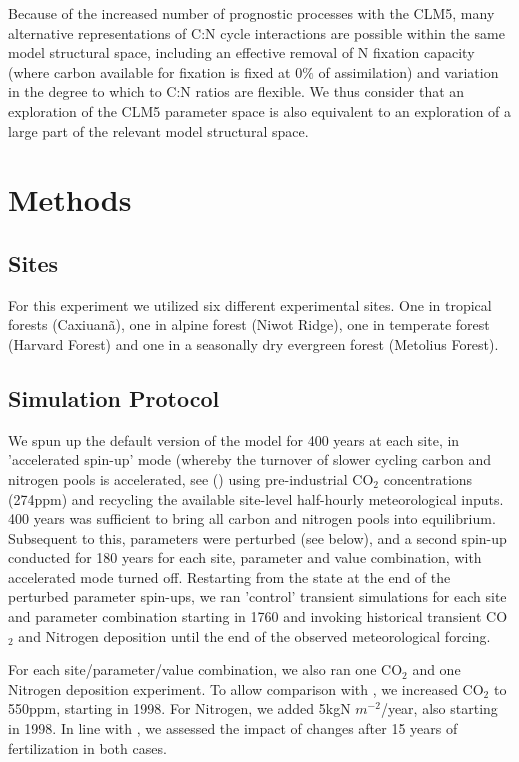 \documentclass[draft,linenumbers]{agujournal}
\begin{document}
Because of the increased number of prognostic processes with the CLM5, many alternative representations of C:N cycle interactions are possible within the same model structural space, including an effective removal of N fixation capacity (where carbon available for fixation is fixed at 0$\%$ of assimilation) and variation in the degree to which to C:N ratios are flexible. We thus consider that an exploration of the CLM5 parameter space is also equivalent to an exploration of a large part of the relevant model structural space.

\section{Methods}

\subsection{Sites}

For this experiment we utilized six different experimental sites. One in tropical forests (Caxiuan\~a), one in alpine forest (Niwot Ridge), one in temperate forest (Harvard Forest) and one in a seasonally dry evergreen forest (Metolius Forest).

\subsection{Simulation Protocol}
We spun up the default version of the model for 400 years at each site, in 'accelerated spin-up' mode (whereby the turnover of slower cycling carbon and nitrogen pools is accelerated, see (\cite{lawrence2018}) using pre-industrial CO$_{2}$ concentrations (274ppm) and recycling the available site-level half-hourly meteorological inputs. 400 years was sufficient to bring all carbon and nitrogen pools into equilibrium. Subsequent to this, parameters were perturbed (see below), and a second spin-up conducted for 180 years for each site, parameter and value combination, with accelerated mode turned off. Restarting from the state at the end of the perturbed parameter spin-ups, we ran 'control' transient simulations for each site and parameter combination starting in 1760 and invoking historical transient CO$_{2}$ and Nitrogen deposition until the end of the observed meteorological forcing.

For each site/parameter/value combination, we also ran one CO$_{2}$ and one Nitrogen deposition experiment. To allow comparison with \cite{wieder}, we increased CO$_{2}$ to 550ppm, starting in 1998. For Nitrogen, we added 5kgN $m^{-2}$/year, also starting in 1998. In line with \cite{wieder}, we assessed the impact of changes after 15 years of fertilization in both cases.
\end{document}
